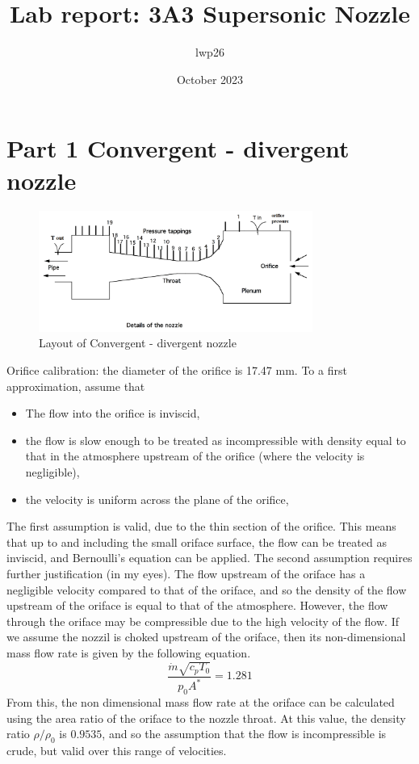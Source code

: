 \documentclass[8pt]{article}
\begin{document}

\title{Lab report: 3A3 Supersonic Nozzle}
\author{lwp26}
\date{October 2023}
\maketitle

\section{Part 1 Convergent - divergent nozzle}

\begin{figure}[H]
    \centering
    \includegraphics[width=0.8\textwidth]{small_nozzle_layout.png}
    \caption{Layout of Convergent - divergent nozzle}
    \label{fig:figure1}
\end{figure}

Orifice calibration: the diameter of the orifice is 17.47 mm. To a first approximation, assume that
\begin{itemize}
    \item The flow into the orifice is inviscid,
    \item the flow is slow enough to be treated as incompressible with density equal to that in the atmosphere upstream of the orifice (where the velocity is negligible),
    \item the velocity is uniform across the plane of the orifice,
\end{itemize} 

The first assumption is valid, due to the thin section of the orifice. This means that up to and including the small oriface surface, the flow can be treated as inviscid, and Bernoulli's equation can be applied.
The second assumption requires further justification (in my eyes). The flow upstream of the oriface has a negligible velocity compared to that of the oriface, and so the density of the flow upstream of the oriface is equal to that of the atmosphere.
However, the flow through the oriface may be compressible due to the high velocity of the flow.
If we assume the nozzil is choked upstream of the oriface, then its non-dimensional mass flow rate is given by the following equation.
\begin{equation}
    \frac{\dot{m}\sqrt{c_pT_0}}{p_0A^*} = 1.281
\end{equation}
From this, the non dimensional mass flow rate at the oriface can be calculated using the area ratio of the oriface to the nozzle throat.
At this value, the density ratio $\rho/\rho_0$ is $0.9535$, and so the assumption that the flow is incompressible is crude, but valid over this range of velocities.
\end{document}
